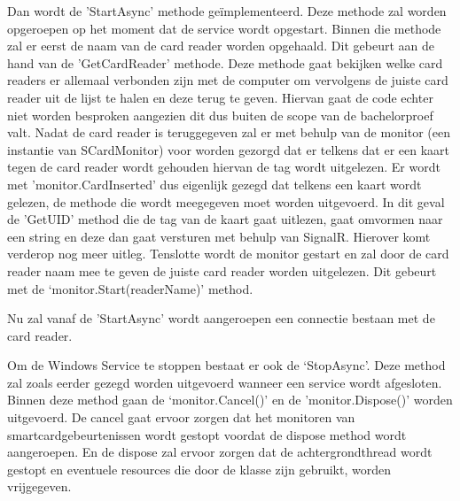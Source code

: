 Dan wordt de 'StartAsync’ methode geïmplementeerd. Deze methode zal worden opgeroepen op het moment dat de service wordt opgestart. Binnen die methode zal er eerst de naam van de card reader worden opgehaald. Dit gebeurt aan de hand van de 'GetCardReader’ methode. Deze methode gaat bekijken welke card readers er allemaal verbonden zijn met de computer om vervolgens de juiste card reader uit de lijst te halen en deze terug te geven. Hiervan gaat de code echter niet worden besproken aangezien dit dus buiten de scope van de bachelorproef valt. Nadat de card reader is teruggegeven zal er met behulp van de monitor (een instantie van SCardMonitor) voor worden gezorgd dat er telkens dat er een kaart tegen de card reader wordt gehouden hiervan de tag wordt uitgelezen. Er wordt met 'monitor.CardInserted’ dus eigenlijk gezegd dat telkens een kaart wordt gelezen, de methode die wordt meegegeven moet worden uitgevoerd. In dit geval de 'GetUID’ method die de tag van de kaart gaat uitlezen, gaat omvormen naar een string en deze dan gaat versturen met behulp van SignalR. Hierover komt verderop nog meer uitleg. Tenslotte wordt de monitor gestart en zal door de card reader naam mee te geven de juiste card reader worden uitgelezen. Dit gebeurt met de ‘monitor.Start(readerName)’ method. 

Nu zal vanaf de 'StartAsync’ wordt aangeroepen een connectie bestaan met de card reader. 

Om de Windows Service te stoppen bestaat er ook de ‘StopAsync’. Deze method zal zoals eerder gezegd worden uitgevoerd wanneer een service wordt afgesloten. Binnen deze method gaan de ‘monitor.Cancel()’ en de 'monitor.Dispose()’ worden uitgevoerd. De cancel gaat ervoor zorgen dat het monitoren van smartcardgebeurtenissen wordt gestopt voordat de dispose method wordt aangeroepen. En de dispose zal ervoor zorgen dat de achtergrondthread wordt gestopt en eventuele resources die door de klasse zijn gebruikt, worden vrijgegeven. 


